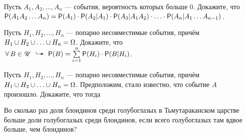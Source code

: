 \documentclass[a4paper,12pt]{article}
\begin{document}
  Пусть $A_1, A_2,\ldots, A_n$ --- события, вероятность которых больше 0. Докажите, что $\mathsf{P}(A_1A_2\ldots A_n)=\mathsf{P}(A_1)\cdot\mathsf{P}(A_2|A_1)\cdot\mathsf{P}(A_3|A_1A_2)\cdot\ldots\cdot\mathsf{P}(A_n|A_1\ldots A_{n-1})$.

  Пусть $H_1,H_2,\ldots,H_n$ --- попарно несовместимые события, причём $H_1\cup H_2\cup\ldots\cup H_n=\Omega$. Докажите, что $\fa B\in\Us\exec\Pf(B)=\sum\limits_{i=1}^n\Pf(H_i)\cdot\Pf(B|H_i)$.


\vspace{-0.1cm}

  Пусть \hfill $H_1,H_2,\ldots,H_n$ \hfill --- \hfill попарно \hfill несовместимые \hfill события, \hfill причём\\$H_1\cup H_2\cup\ldots\cup H_n=\Omega$. Предположим, стало известно, что событие $A$ произошло. Докажите, что тогда 

\vspace{-0.15cm}

  Во сколько раз доля блондинов среди голубоглазых в Тьмутараканском царстве больше доли голубоглазых среди блондинов, если всего голубоглазых там вдвое больше, чем блондинов?





\end{document}
